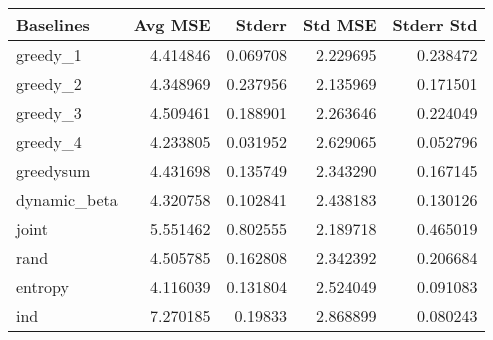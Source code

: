 \begin{tabular}{lrrrr}
\toprule
    Baselines &   Avg MSE &    Stderr &   Std MSE &  Stderr Std \\
\midrule
     greedy\_1 &  4.414846 &  0.069708 &  2.229695 &    0.238472 \\
     greedy\_2 &  4.348969 &  0.237956 &  2.135969 &    0.171501 \\
     greedy\_3 &  4.509461 &  0.188901 &  2.263646 &    0.224049 \\
     greedy\_4 &  4.233805 &  0.031952 &  2.629065 &    0.052796 \\
   greedysum &  4.431698 &  0.135749 &  2.343290 &    0.167145 \\
 dynamic\_beta &  4.320758 &  0.102841 &  2.438183 &    0.130126 \\
        joint &  5.551462 &  0.802555 &  2.189718 &    0.465019 \\
         rand &  4.505785 &  0.162808 &  2.342392 &    0.206684 \\
      entropy &  4.116039 &  0.131804 &  2.524049 &    0.091083 \\
       ind &  7.270185 &  0.19833 &  2.868899 &    0.080243 \\
\bottomrule
\end{tabular}

